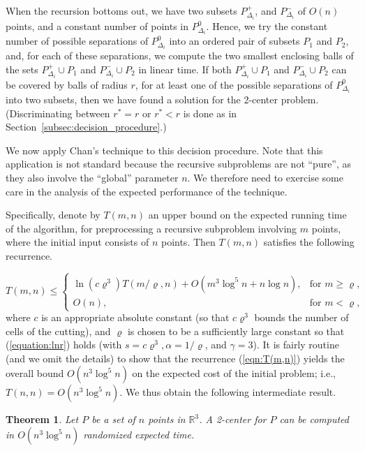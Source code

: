 \documentclass[a4paper,12pt]{article}
\newtheorem{theorem}{Theorem}[section]
\begin{document}
When the recursion bottoms out, we have two subsets
$P_{\Delta_i}^+$, and $P_{\Delta_i}^-$ of $O(n)$ points, and a
constant number of points in $P_{\Delta_i}^0$. Hence, we try the
constant number of possible separations of $P_{\Delta_i}^0$ into an
ordered pair of subsets $P_1$ and $P_2$, and, for each of these separations, we compute the two
smallest enclosing balls of the sets $P_{\Delta_i}^+ \cup P_1$ and
$P_{\Delta_i}^- \cup P_2$ in linear time. If both $P_{\Delta_i}^+
\cup P_1$ and $P_{\Delta_i}^- \cup P_2$ can be covered by balls of
radius $r$, for at least one of the possible separations of
$P_{\Delta_i}^0$ into two subsets, then we have found a solution for
the 2-center problem. (Discriminating between $r^* = r$ or $r^* < r$
is done as in Section~\ref{subsec:decision_procedure}.)

We now apply Chan's technique to this decision procedure. Note that
this application is not standard because the recursive subproblems are
not ``pure'', as they also involve the ``global'' parameter $n$. We
therefore need to exercise some care in the analysis of the expected
performance of the technique.

Specifically, denote by $T(m,n)$ an upper bound on the expected
running time of the algorithm, for preprocessing
a recursive subproblem involving $m$ points, where the initial input
consists of $n$ points. Then $T(m,n)$ satisfies the following recurrence.

\begin{equation}
\label{eqn:T(m,n)}
T(m,n) \leq \left\{ \begin{array}{ll}
\ln(c\varrho^3)T(m/\varrho,n) + O(m^3 \log^5 n + n\log n),   & \mbox{for $m \geq \varrho$,}\\
O(n),                                        & \mbox{for $m <
\varrho$,}
\end{array}\right.
\end{equation}
where $c$ is an appropriate absolute constant (so that $c\varrho^3$
bounds the number of cells of the cutting), and $\varrho$ is chosen
to be a sufficiently large constant so that (\ref{equation:lnr})
holds (with $s = c\varrho^3, \alpha = 1/\varrho$, and $\gamma = 3$).
It is fairly routine (and we omit the details) to show that the
recurrence (\ref{eqn:T(m,n)}) yields the overall bound $O(n^3 \log^5
n)$ on the expected cost of the initial problem; i.e., $T(n,n) =
O(n^3 \log^5 n)$. We thus obtain the following intermediate result.

\begin{theorem}
Let $P$ be a set of $n$ points in $\mathbb{R}^3$. A 2-center for $P$
can be computed in $O(n^3 \log^5 n)$ randomized expected time.
\end{theorem}
\end{document}
